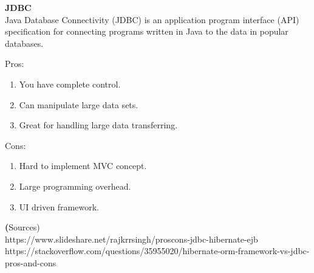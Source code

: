 		\textbf{JDBC} \\
		Java Database Connectivity (JDBC) is an application program interface (API) specification for connecting programs written in Java to the data in popular databases.
		
		Pros:
		\begin{enumerate}
			\item You have complete control.
			\item Can manipulate large data sets.
			\item Great for handling large data transferring.
		\end{enumerate}
		Cons:
		\begin{enumerate}
			\item Hard to implement MVC concept.
			\item Large programming overhead.
			\item UI driven framework.
		\end{enumerate}
	
	\textbf(Sources)\\
	https://www.slideshare.net/rajkrrsingh/proscons-jdbc-hibernate-ejb \\
	https://stackoverflow.com/questions/35955020/hibernate-orm-framework-vs-jdbc-pros-and-cons \\